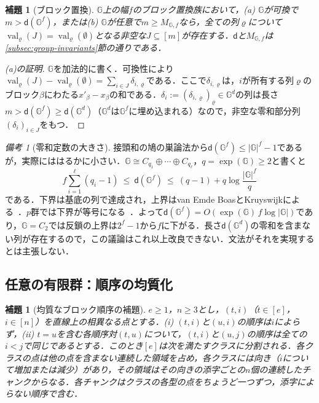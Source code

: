 \documentclass[11pt,a4paper]{ltjsarticle}
\numberwithin{equation}{section}
\theoremstyle{plain}
\newtheorem{lemma}[theorem]{補題}
\theoremstyle{definition}
\theoremstyle{remark}
\newtheorem{remark}[theorem]{備考}
\begin{document}
\begin{lemma}[ブロック置換]
\label{lem:block-replacement}
${\mathbb G}$上の幅$f$のブロック置換族において，(a) ${\mathbb G}$が可換で$m>\mathsf d({\mathbb G}^f)$，または(b) ${\mathbb G}$が任意で$m\ge M_{{\mathbb G},f}$なら，全ての列$\varrho$について$\operatorname{val}_\varrho(J)=\operatorname{val}_\varrho(\emptyset)$となる非空な$J\subseteq[m]$が存在する．$\mathsf d$と$M_{{\mathbb G},f}$は\ref{subsec:group-invariants}節の通りである．
\end{lemma}

\begin{proof}[(a)の証明]
${\mathbb G}$を加法的に書く．可換性により$\operatorname{val}_\varrho(J)-\operatorname{val}_\varrho(\emptyset)=\sum_{i\in J}\delta_{i,\varrho}$である．ここで$\delta_{i,\varrho}$は，$i$が所有する列$\varrho$のブロック$\beta$にわたる$x'_\beta-x_\beta$の和である．$\delta_i:=(\delta_{i,\varrho})_\varrho\in {\mathbb G}^d$の列は長さ$m>\mathsf d({\mathbb G}^f)\ge\mathsf d({\mathbb G}^d)$（${\mathbb G}^d$は${\mathbb G}^f$に埋め込まれる）なので，非空な零和部分列$(\delta_i)_{i\in J}$をもつ．
\end{proof}

\begin{remark}[零和定数の大きさ]
\label{rem:davenport-size}
接頭和の鳩の巣論法から$\mathsf d({\mathbb G}^f)\le|{\mathbb G}|^f-1$であるが，実際にははるかに小さい．${\mathbb G}\cong C_{q_1}\oplus\cdots\oplus C_{q_\ell}$，$q=\exp({\mathbb G})\ge2$と書くと
\[
 f\sum_{i=1}^{\ell}(q_i-1)\ \le\ \mathsf d({\mathbb G}^f)\ \le\ (q-1)+q\log\frac{|{\mathbb G}|^f}{q}
\]
である．下界は基底の列で達成され，上界はvan Emde BoasとKruyswijkによる~\cite[Proposition~5.1.8 and Theorem~5.5.5]{GeroldingerHalterKoch2006}．$p$群では下界が等号になる~\cite[Theorem~5.5.9]{GeroldingerHalterKoch2006}．よって$\mathsf d({\mathbb G}^f)=O(\exp({\mathbb G})\,f\log|{\mathbb G}|)$であり，${\mathbb G}=C_2$では反鎖の上界は$2^f-1$から$f$に下がる．長さ$\mathsf d({\mathbb G}^d)$の零和を含まない列が存在するので，この議論はこれ以上改良できない．文法がそれを実現するとは主張しない．
\end{remark}

\subsection{任意の有限群：順序の均質化}
\label{app:window-group}

\begin{lemma}[均質なブロック順序の補題]
\label{lem:group-block-order}
$e\ge1$，$n\ge3$とし，$(t,i)$（$t\in[e]$，$i\in[n]$）を直線上の相異なる点とする．(i) $(t,i)$と$(u,i)$の順序は$i$によらず，(ii) $t=u$を含む各順序対$(t,u)$について，$(t,i)$と$(u,j)$の順序は全ての$i<j$で同じであるとする．このとき$[e]$は次を満たすクラスに分割される．各クラスの点は他の点を含まない連続した領域を占め，各クラスには向き（$i$について増加または減少）があり，その領域はその向きの添字ごとの$n$個の連続した\emph{チャンク}からなる．各チャンクはクラスの各型の点をちょうど一つずつ，添字によらない順序で含む．
\end{lemma}
\end{document}
